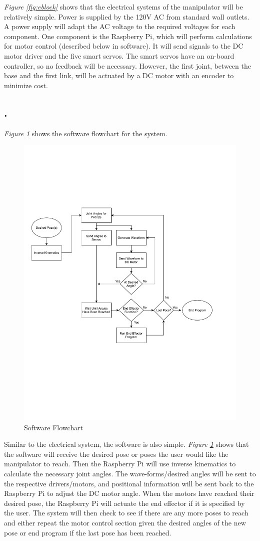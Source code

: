 \documentclass[12pt]{report}
\newcommand{\hiddensubsection}[1]{
  \stepcounter{subsection}
  \subsection*{\arabic{section}.\arabic{subsection}\hspace{1em}{#1}}
}
\begin{document}
\emph{Figure \ref{fig:eblock}} shows that the electrical systems of the manipulator will be relatively simple. Power is supplied by the 120V AC from standard wall outlets. A power supply will adapt the AC voltage to the required voltages for each component. One component is the Raspberry Pi, which will perform calculations for motor control (described below in software). It will send signals to the DC motor driver and the five smart servos. The smart servos have an on-board controller, so no feedback will be necessary. However, the first joint, between the base and the first link, will be actuated by a DC motor with an encoder to minimize cost.

\hiddensubsection{Software}
\emph{Figure \ref{fig:sblock}} shows the software flowchart for the system.
\begin{figure}[ht]
  \centering
  \includegraphics[width=.85\textwidth]{sblock}
  \caption{Software Flowchart}
  \label{fig:sblock}
\end{figure}

Similar to the electrical system, the software is also simple. \emph{Figure \ref{fig:sblock}} shows that the software will receive the desired pose or poses the user would like the manipulator to reach. Then the Raspberry Pi will use inverse kinematics to calculate the necessary joint angles. The wave-forms/desired angles will be sent to the respective drivers/motors, and positional information will be sent back to the Raspberry Pi to adjust the DC motor angle. When the motors have reached their desired pose, the Raspberry Pi will actuate the end effector if it is specified by the user. The system will then check to see if there are any more poses to reach and either repeat the motor control section given the desired angles of the new pose or end program if the last pose has been reached.
\newpage
\end{document}
